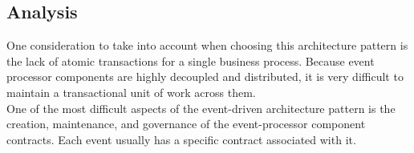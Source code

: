 \subsection{Analysis}
One consideration to take into account when choosing this architecture pattern is the lack of atomic transactions for a single business process. Because event processor components are highly decoupled and distributed, it is very difficult to maintain a transactional unit of work across them. \\
One of the most difficult aspects of the event-driven architecture pattern is the creation, maintenance, and governance of the event-processor component contracts. Each event usually has a specific contract associated with it.



